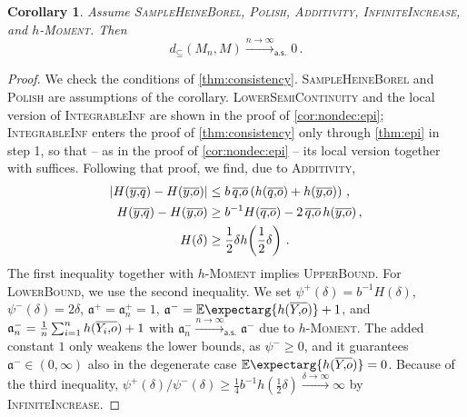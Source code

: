 \documentclass{scrartcl}
\renewcommand{\subset}{\subseteq}
\newcommand{\Ex}{\E\expectarg}
\newcommand*{\ms}[1]{\mathsf{#1}}
\newcommand*{\mf}[1]{\mathfrak{#1}}
\newcommand{\equationFullstop}{\, .}
\newcommand{\eqfs}{\equationFullstop}
\newcommand{\equationComma}{\, ,}
\newcommand{\eqcm}{\equationComma}
\theoremstyle{plain}\newtheorem{theorem}{Theorem}[section]
\newtheorem{corollary}[theorem]{Corollary}
\theoremstyle{definition}
\theoremstyle{remark}
\begin{document}
\begin{corollary}\label{cor:nondec:onehaus}
	Assume \textsc{SampleHeineBorel}, \textsc{Polish}, \textsc{Additivity}, \textsc{InfiniteIncrease}, and \textsc{$h$-Moment}.
	Then
	\begin{equation*}
		d_\subset(M_n, M) \xrightarrow{n\to\infty}_{\ms{a.s.}} 0
		\eqfs
	\end{equation*}
\end{corollary}
\begin{proof}
	We check the conditions of \autoref{thm:consistency}. \textsc{SampleHeineBorel} and \textsc{Polish} are assumptions of the corollary. \textsc{LowerSemiContinuity} and the local version of \textsc{IntegrableInf} are shown in the proof of \autoref{cor:nondec:epi}; \textsc{IntegrableInf} enters the proof of \autoref{thm:consistency} only through \autoref{thm:epi} in step 1, so that -- as in the proof of \autoref{cor:nondec:epi} -- its local version together with \cite[Theorem 8.2]{korf01} suffices.
	Following that proof, we find, due to \textsc{Additivity},
	\begin{align*}
		\abs{H(\ol yq) - H(\ol yo)} &\leq b\, \ol qo \br{h(\ol qo) + h(\ol yo)}\eqcm
		\\
		H(\ol yq) - H(\ol yo) &\geq 	b^{-1} H( \ol qo) - 2 \,\ol qo\, h( \ol yo)\eqcm\\
		H(\delta)  &\geq \frac12 \delta h\brOf{\frac12 \delta}
		\eqfs
	\end{align*}
	The first inequality together with \textsc{$h$-Moment} implies \textsc{UpperBound}.
	For \textsc{LowerBound}, we use the second inequality. We set $\psi^+(\delta) = 	b^{-1} H(\delta)$, $\psi^-(\delta) = 2 \delta$, $\mf a^+=\mf a_n^+ = 1$, $\mf a^{-} = \Ex{h(\ol Yo)} + 1$, and $\mf a^-_n = \frac1n \sum_{i=1}^n h(\ol {Y_i}o) + 1$ with $\mf a^-_n\xrightarrow{n\to\infty}_{\ms{a.s.}}\mf a^-$ due to \textsc{$h$-Moment}. The added constant $1$ only weakens the lower bounds, as $\psi^-\geq0$, and it guarantees $\mf a^-\in(0,\infty)$ also in the degenerate case $\Ex{h(\ol Yo)} = 0$. Because of the third inequality, $\psi^+(\delta)/\psi^-(\delta) \geq \frac14 b^{-1} h(\frac12 \delta) \xrightarrow{\delta\to\infty} \infty$ by \textsc{InfiniteIncrease}.
\end{proof}
\end{document}
